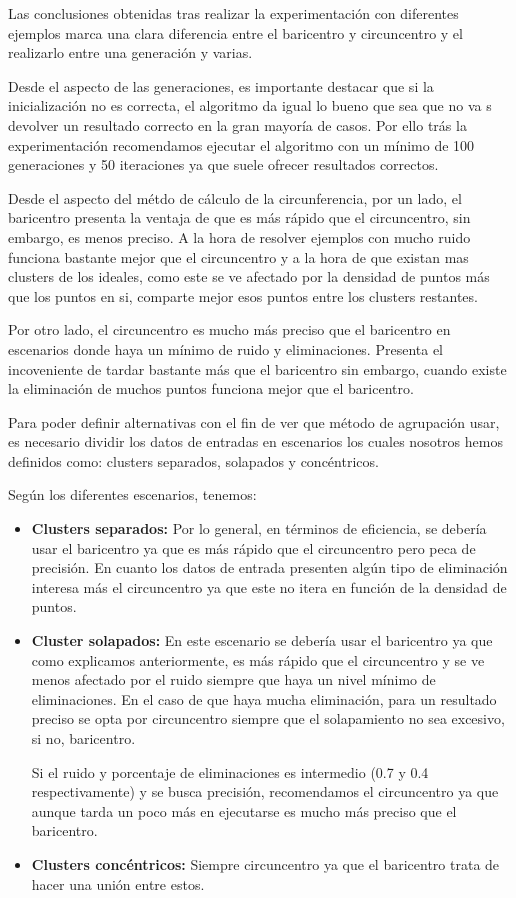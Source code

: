 \documentclass[conference,a4paper]{IEEEtran}
\begin{document}
Las conclusiones obtenidas tras realizar la experimentación con diferentes ejemplos marca una clara diferencia entre el baricentro y circuncentro y el realizarlo entre una generación y varias.

Desde el aspecto de las generaciones, es importante destacar que si la inicialización no es correcta, el algoritmo da igual lo bueno que sea que no va s devolver un resultado correcto en la gran mayoría de casos. Por ello trás la experimentación recomendamos ejecutar el algoritmo con un mínimo de 100 generaciones y 50 iteraciones ya que suele ofrecer resultados correctos.

Desde el aspecto del métdo de cálculo de la circunferencia, por un lado, el baricentro presenta la ventaja de que es más rápido que el circuncentro, sin embargo, es menos preciso. A la hora de resolver ejemplos con mucho ruido funciona bastante mejor que el circuncentro y a la hora de que existan mas clusters de los ideales, como este se ve afectado por la densidad de puntos más que los puntos en si, comparte mejor esos puntos entre los clusters restantes.

Por otro lado, el circuncentro es mucho más preciso que el baricentro en escenarios donde haya un mínimo de ruido y eliminaciones. Presenta el incoveniente de tardar bastante más que el baricentro  sin embargo, cuando existe la eliminación de muchos puntos funciona mejor que el baricentro.

Para poder definir alternativas con el fin de ver que método de agrupación usar, es necesario dividir los datos de entradas en escenarios los cuales nosotros hemos definidos como: clusters separados, solapados y concéntricos.

Según los diferentes escenarios, tenemos:

\begin{itemize}

\item{\textbf{Clusters separados:} Por lo general, en términos de eficiencia, se debería usar el baricentro ya que es más rápido que el circuncentro pero peca de precisión. En cuanto los datos de entrada presenten algún tipo de eliminación interesa más el circuncentro ya que este no itera en función de la densidad de puntos.}

\item{\textbf{Cluster solapados:} En este escenario se debería usar el baricentro ya que como explicamos anteriormente, es más rápido que el circuncentro y se ve menos afectado por el ruido siempre que haya un nivel mínimo de eliminaciones. En el caso de que haya mucha eliminación, para un resultado preciso se opta por circuncentro siempre que el solapamiento no sea excesivo, si no, baricentro.

Si el ruido y porcentaje de eliminaciones es intermedio (0.7 y 0.4 respectivamente) y se busca precisión, recomendamos el circuncentro ya que aunque tarda un poco más en ejecutarse es mucho más preciso que el baricentro.}

\item{\textbf{Clusters concéntricos:} Siempre circuncentro ya que el baricentro trata de hacer una unión entre estos.}
\end{itemize}
\end{document}
